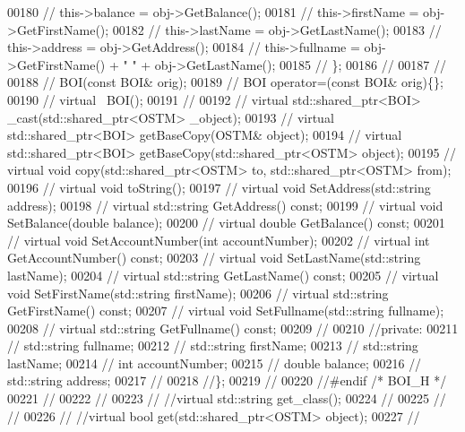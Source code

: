 \begin{DoxyCode}
00180 \textcolor{comment}{//        this->balance = obj->GetBalance();}
00181 \textcolor{comment}{//        this->firstName = obj->GetFirstName();}
00182 \textcolor{comment}{//        this->lastName = obj->GetLastName();}
00183 \textcolor{comment}{//        this->address = obj->GetAddress();}
00184 \textcolor{comment}{//        this->fullname = obj->GetFirstName() + " " + obj->GetLastName(); }
00185 \textcolor{comment}{//    \};}
00186 \textcolor{comment}{//    }
00187 \textcolor{comment}{//}
00188 \textcolor{comment}{//    BOI(const BOI& orig);}
00189 \textcolor{comment}{//    BOI operator=(const BOI& orig)\{\};}
00190 \textcolor{comment}{//    virtual ~BOI();}
00191 \textcolor{comment}{//}
00192 \textcolor{comment}{//    virtual std::shared\_ptr<BOI> \_cast(std::shared\_ptr<OSTM> \_object);}
00193 \textcolor{comment}{//    virtual std::shared\_ptr<BOI> getBaseCopy(OSTM& object);}
00194 \textcolor{comment}{//    virtual std::shared\_ptr<BOI> getBaseCopy(std::shared\_ptr<OSTM> object);}
00195 \textcolor{comment}{//    virtual void copy(std::shared\_ptr<OSTM> to, std::shared\_ptr<OSTM> from);}
00196 \textcolor{comment}{//    virtual void toString();}
00197 \textcolor{comment}{//    virtual void SetAddress(std::string address);}
00198 \textcolor{comment}{//    virtual std::string GetAddress() const;}
00199 \textcolor{comment}{//    virtual void SetBalance(double balance);}
00200 \textcolor{comment}{//    virtual double GetBalance() const;}
00201 \textcolor{comment}{//    virtual void SetAccountNumber(int accountNumber);}
00202 \textcolor{comment}{//    virtual int GetAccountNumber() const;}
00203 \textcolor{comment}{//    virtual void SetLastName(std::string lastName);}
00204 \textcolor{comment}{//    virtual std::string GetLastName() const;}
00205 \textcolor{comment}{//    virtual void SetFirstName(std::string firstName);}
00206 \textcolor{comment}{//    virtual std::string GetFirstName() const;}
00207 \textcolor{comment}{//    virtual void SetFullname(std::string fullname);}
00208 \textcolor{comment}{//    virtual std::string GetFullname() const;}
00209 \textcolor{comment}{//    }
00210 \textcolor{comment}{//private:}
00211 \textcolor{comment}{//    std::string fullname;}
00212 \textcolor{comment}{//    std::string firstName;}
00213 \textcolor{comment}{//    std::string lastName;}
00214 \textcolor{comment}{//    int accountNumber;}
00215 \textcolor{comment}{//    double balance;}
00216 \textcolor{comment}{//    std::string address;}
00217 \textcolor{comment}{//}
00218 \textcolor{comment}{//\};}
00219 \textcolor{comment}{//}
00220 \textcolor{comment}{//#endif /* BOI\_H */}
00221 \textcolor{comment}{//}
00222 \textcolor{comment}{// }
00223 \textcolor{comment}{//    //virtual std::string get\_class();}
00224 \textcolor{comment}{//    }
00225 \textcolor{comment}{//   // }
00226 \textcolor{comment}{//    //virtual bool get(std::shared\_ptr<OSTM> object);}
00227 \textcolor{comment}{// }
\end{DoxyCode}
